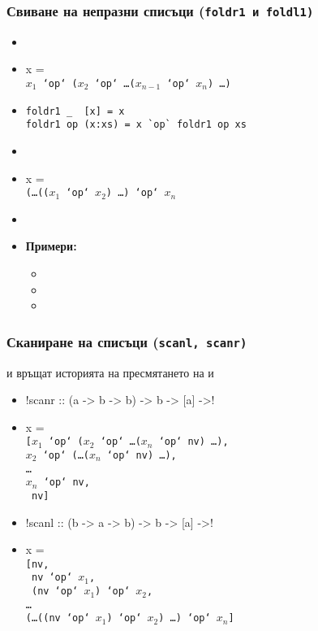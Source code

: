 \documentclass{beamer}
\begin{document}
\begin{frame}[fragile]
  \frametitle{Свиване на непразни списъци (\tt{foldr1} и \tt{foldl1})}

  \begin{itemize}[<+->]
  \item {}
  \item {}\hlist x = \\
    $x_1$\tt{ `op` (}$x_2$\tt{ `op` }\ldots \tt($x_{n-1}$\tt{ `op` }$x_n$\tt) \ldots\tt)
  \item
\begin{lstlisting}
foldr1 _  [x] = x
foldr1 op (x:xs) = x `op` foldr1 op xs
\end{lstlisting}
  \item {}
  \item {}\hlist x = \\
    \tt(\ldots\tt{((}$x_1$\tt{ `op` }$x_2$\tt) \ldots \tt{) `op` }$x_n$
  \item {}
  \item \textbf{Примери:}
    \begin{itemize}
    \item {}
    \item {}
    \item {}
    \end{itemize}
  \end{itemize}
\end{frame}

\begin{frame}
  \frametitle{Сканиране на списъци (\tt{scanl}, \tt{scanr})}

   и  връщат историята на пресмятането на  и 
  \pause\small
  \begin{itemize}[<+->]
  \item \lst!scanr :: (a -> b -> b) -> b -> [a] ->! \tta{[b]}
  \item {} \hlist x = \\
    \tt[$x_1$\tt{ `op` (}$x_2$\tt{ `op` }\ldots \tt($x_n$\tt{ `op` nv)} \ldots\tt{),}\\
    $x_2$\tt{ `op` (}\ldots \tt($x_n$\tt{ `op` nv)} \ldots\tt{),}\\
    \ldots\\
    $x_n$\tt{ `op` nv,}\\
    \tt{ nv]}
  \item \lst!scanl :: (b -> a -> b) -> b -> [a] ->! \tta{[b]}
  \item {} \hlist x = \\
    \tt{[nv,}\\
    \tt{ nv `op` }$x_1$\tt,\\
    \tt{ (nv `op` }$x_1$\tt{) `op` }$x_2$\tt,\\
    \ldots\\
    \tt{(\ldots((nv `op` $x_1$) `op` $x_2$) \ldots ) `op` $x_n$]}
  \end{itemize}
\end{frame}
\end{document}
